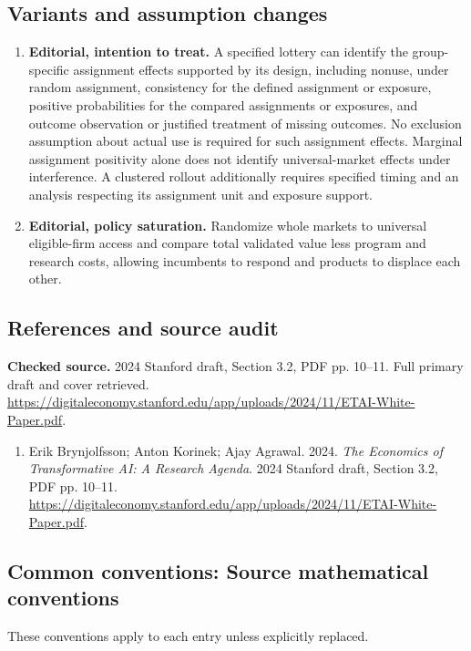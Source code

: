 \documentclass[11pt,a4paper]{article}
\begin{document}
\subsection*{Variants and assumption changes}
\begin{enumerate}
\item \textbf{Editorial, intention to treat.} A specified lottery can identify the group-specific assignment effects supported by its design, including nonuse, under random assignment, consistency for the defined assignment or exposure, positive probabilities for the compared assignments or exposures, and outcome observation or justified treatment of missing outcomes. No exclusion assumption about actual use is required for such assignment effects. Marginal assignment positivity alone does not identify universal-market effects under interference. A clustered rollout additionally requires specified timing and an analysis respecting its assignment unit and exposure support.
\item \textbf{Editorial, policy saturation.} Randomize whole markets to universal eligible-firm access and compare total validated value less program and research costs, allowing incumbents to respond and products to displace each other.
\end{enumerate}
\subsection*{References and source audit}
\textbf{Checked source.} 2024 Stanford draft, Section 3.2, PDF pp. 10--11. Full primary draft and cover retrieved. \url{https://digitaleconomy.stanford.edu/app/uploads/2024/11/ETAI-White-Paper.pdf}.
\begin{enumerate}\raggedright
\item\hypertarget{definitions:source:30007694:1}{} Erik Brynjolfsson; Anton Korinek; Ajay Agrawal. 2024. \emph{The Economics of Transformative AI: A Research Agenda}. 2024 Stanford draft, Section 3.2, PDF pp. 10--11.
\url{https://digitaleconomy.stanford.edu/app/uploads/2024/11/ETAI-White-Paper.pdf}.
\end{enumerate}

\subsection*{Common conventions: Source mathematical conventions}

These conventions apply to each entry unless explicitly replaced.
\end{document}
